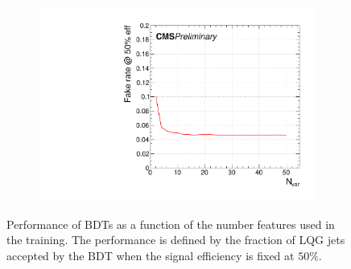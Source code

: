 \begin{figure}[]
    \begin{center}
        \begin{subfigure}[t]{0.5\textwidth}
            \includegraphics[width=\textwidth]{figures/toptagging/bdt/fakerate_vs_eff50.pdf}
        \end{subfigure}
        \caption{Performance of BDTs as a function of the number features used in the training.
                 The performance is defined by the fraction of LQG jets accepted by the BDT when the signal efficiency is fixed at $50\%$.}
        \label{fig:jets:training}
    \end{center}
\end{figure}

